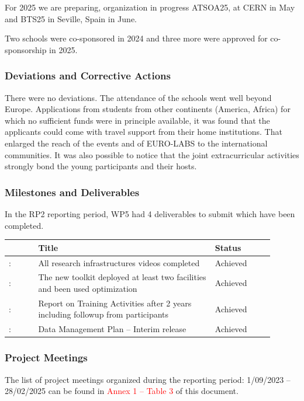 For 2025 we are preparing, organization in progress
ATSOA25, at CERN in May and
BTS25 in Seville, Spain in June.

Two schools were co-sponsored in 2024 and three more were approved for co-sponsorship in 2025.

\subsubsection*{Deviations and Corrective Actions}

There were no deviations. The attendance of the schools went well beyond Europe.
Applications from students from other continents (America, Africa) for which 
no sufficient funds were in principle available, %
it was found 
that the applicants could come with travel support from their home institutions. That enlarged the reach of the events and of EURO-LABS to the international communities. 
It was also possible to notice that the joint extracurricular activities strongly bond the young participants and their hosts.
\subsubsection*{Milestones and Deliverables}
In the RP2 reporting period, WP5 had 4 deliverables to submit which have been completed.

{\fontsize{9}{11}\selectfont
\begin{center}
  \begin{tabular}[t]{!{\color{mygray}\vrule}p{0.10\linewidth}!
  {\color{mygray}\vrule}p{0.60\linewidth}!
  {\color{mygray}\vrule}p{0.20\linewidth}!{\color{mygray}\vrule} } \hline
     & {\bf Title} & {\bf Status} \\ 

    \hline
    : & All research  infrastructures videos completed & Achieved \\
    \hline
    : & The new toolkit deployed at least two facilities and been used optimization  & Achieved \\
    \hline
    : & Report on Training Activities after 2 years including followup from participants & Achieved \\ 
    \hline
    : & Data Management Plan – Interim release  & Achieved \\ 
    \hline
  \end{tabular}
\end{center}
}

\subsubsection*{Project Meetings}
The list of project meetings organized during the reporting period: 1/09/2023 – 28/02/2025 can be found in \textcolor{red}{Annex 1 – Table 3} of this document.



